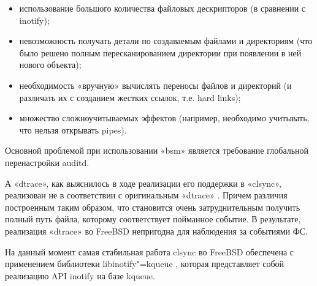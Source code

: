 \documentclass[10pt, a5paper]{article}
\begin{document}
\begin{itemize}
  \item использование большого количества файловых дескрипторов (в сравнении с inotify);
  \item невозможность получать детали по создаваемым файлами и директориям (что было решено полным пересканированием директории при появлении в ней нового объекта);
  \item необходимость «вручную» вычислять переносы файлов и директорий (и различать их с созданием жестких ссылок, т.е. hard links);
  \item множество сложноучитываемых эффектов (например, необходимо учитывать, что нельзя открывать pipes).
\end{itemize}

Основной проблемой при использовании «bsm» является требование глобальной перенастройки auditd.

А «dtrace», как выяснилось в ходе реализации его поддержки в «clsync», реализован не в соответствии с оригинальным «dtrace» \cite{Okunev15}. Причем различия построенным таким образом, что становится очень затруднительным получить полный путь файла, которому соответствует пойманное событие. В результате, реализация «dtrace» во FreeBSD непригодна для наблюдения за событиями ФС.

На данный момент самая стабильная работа clsync во FreeBSD обеспечена с применением библиотеки libinotify"=kqueue \cite{Okunev16}, которая представляет собой реализацию API inotify на базе kqueue.
\end{document}
